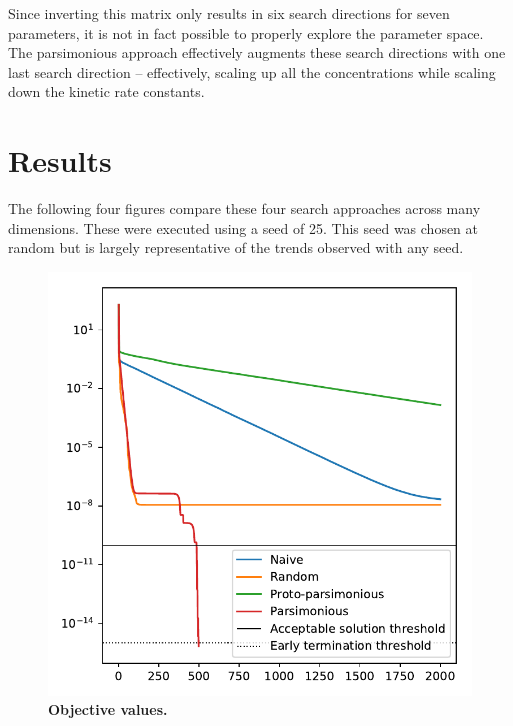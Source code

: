 \documentclass{article}
\begin{document}
Since inverting this matrix only results in six search directions for seven parameters, it is not in fact possible to properly explore the parameter space.  The parsimonious approach effectively augments these search directions with one last search direction -- effectively, scaling up all the concentrations while scaling down the kinetic rate constants.

\section{Results}

The following four figures compare these four search approaches across many dimensions.  These were executed using a seed of 25.  This seed was chosen at random but is largely representative of the trends observed with any seed.

\begin{figure}[!ht]
\centering
\includegraphics{seed25/figure1-objective}
\caption{\textbf{Objective values.}}
\label{figure:objective}
\end{figure}
\end{document}

